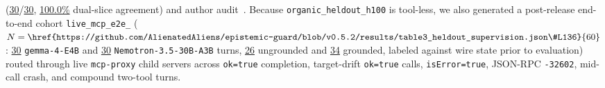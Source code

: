 \documentclass[10pt,twocolumn]{article}
\begin{document}
(\href{https://github.com/AlienatedAliens/epistemic-guard/blob/v0.5.2/results/table3_heldout_supervision.json\#L44}{30}/\href{https://github.com/AlienatedAliens/epistemic-guard/blob/v0.5.2/results/table3_heldout_supervision.json\#L46}{30}, \href{https://github.com/AlienatedAliens/epistemic-guard/blob/v0.5.2/results/table3_heldout_supervision.json\#L45}{100.0\%} dual-slice agreement) and author audit~\cite{maxwell2026evasion}. Because \texttt{organic\_\allowbreak heldout\_\allowbreak h100} is tool-less, we also generated a post-release end-to-end cohort \texttt{live\_\allowbreak mcp\_\allowbreak e2e\_} ($N=\href{https://github.com/AlienatedAliens/epistemic-guard/blob/v0.5.2/results/table3_heldout_supervision.json\#L136}{60}$: \href{https://github.com/AlienatedAliens/epistemic-guard/blob/v0.5.2/results/table3_heldout_supervision.json\#L124}{30} \texttt{gemma-4-E4B} and \href{https://github.com/AlienatedAliens/epistemic-guard/blob/v0.5.2/results/table3_heldout_supervision.json\#L143}{30} \texttt{Nemotron-3.5-30B-A3B} turns, \href{https://github.com/AlienatedAliens/epistemic-guard/blob/v0.5.2/results/table3_heldout_supervision.json\#L135}{26} ungrounded and \href{https://github.com/AlienatedAliens/epistemic-guard/blob/v0.5.2/results/table3_heldout_supervision.json\#L134}{34} grounded, labeled against wire state prior to evaluation) routed through live \texttt{mcp-proxy} child servers across \texttt{ok=true} completion, target-drift \texttt{ok=true} calls, \texttt{isError=true}, JSON-RPC \texttt{-32602}, mid-call crash, and compound two-tool turns.
\end{document}
